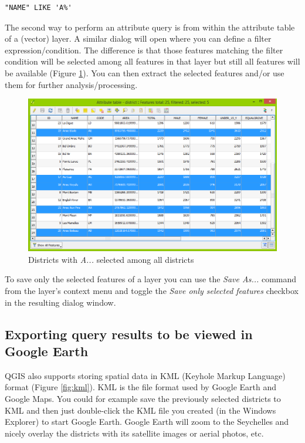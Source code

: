 \documentclass[a4paper,12pt,titlepage]{article}
\begin{document}
\begin{lstlisting}[caption={Filter districts whose name starts with \textit{A}},label=lst:districts_with_a]
"NAME" LIKE 'A%'
\end{lstlisting}

The second way to perform an attribute query is from within the attribute table of a (vector) layer.
A similar dialog will open where you can define a filter expression/condition. The difference is that those features matching the filter condition will be selected among all features in that layer but still all features will be available (Figure \ref{fig:filter1}). You can then extract the selected features and/or use them for further analysis/processing.

\begin{figure}[htb]
\centering
\includegraphics[width=12cm]{Images/filter1.png}
\caption{Districts with \textit{A...} selected among all districts}\label{fig:filter1}
\end{figure}

To save only the selected features of a layer you can use the \textit{Save As...} command from the layer's context menu and toggle the \textit{Save only selected features} checkbox in the resulting dialog window.

\subsection{Exporting query results to be viewed in Google Earth}
QGIS also supports storing spatial data in KML (Keyhole Markup Language) format (Figure \ref{fig:kml}). KML is the file format used by Google Earth and Google Maps. You could for example save the previously selected districts to KML and then just double-click the KML file you created (in the Windows Explorer) to start Google Earth. Google Earth will zoom to the Seychelles and nicely overlay the districts with its satellite images or aerial photos, etc. 
\end{document}
